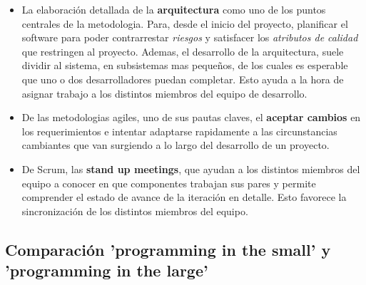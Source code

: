 \begin{itemize}
		\item La elaboración detallada de la \textbf{arquitectura} como uno de los puntos centrales de la metodologia. Para, desde el inicio del proyecto, planificar el software para poder contrarrestar \emph{riesgos} y satisfacer los \emph{atributos de calidad} que restringen al proyecto. Ademas, el desarrollo de la arquitectura, suele dividir al sistema, en subsistemas mas pequeños, de los cuales es esperable que uno o dos desarrolladores puedan completar. Esto ayuda a la hora de asignar trabajo a los distintos miembros del equipo de desarrollo.

		\item De las metodologias agiles, uno de sus pautas claves, el \textbf{aceptar cambios} en los requerimientos e intentar adaptarse rapidamente a las circunstancias cambiantes que van surgiendo a lo largo del desarrollo de un proyecto.

		\item De Scrum, las \textbf{stand up meetings}, que ayudan a los distintos miembros del equipo a conocer en que componentes trabajan sus pares y permite comprender el estado de avance de la iteración en detalle. Esto favorece la sincronización de los distintos miembros del equipo.

	\end{itemize}

\subsection{Comparación 'programming in the small' y 'programming in the large'}

